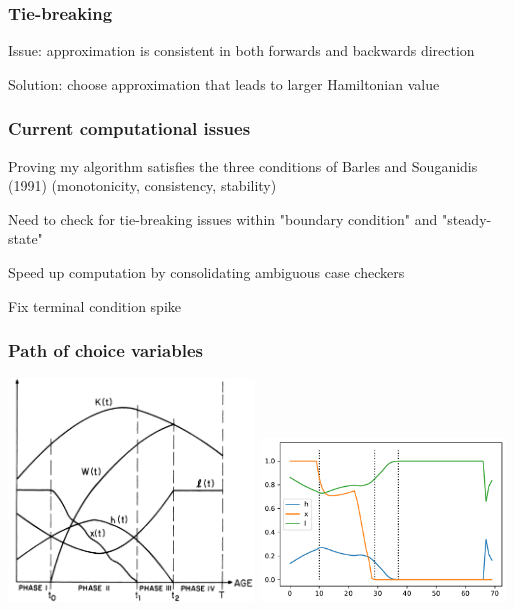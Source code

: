 \documentclass[aspectratio=169]{beamer}
\newenvironment{wideitemize}{\itemize\addtolength{\itemsep}{10pt}}{\enditemize}
\begin{document}
\begin{frame}
    \frametitle{Tie-breaking}

    \begin{wideitemize}
        \item Issue: approximation is consistent in both forwards and backwards direction
        \item Solution: choose approximation that leads to larger Hamiltonian value
    \end{wideitemize}

\end{frame}

\begin{frame}
    \frametitle{Current computational issues}

    \begin{wideitemize}
        \item Proving my algorithm satisfies the three conditions of Barles and Souganidis (1991) (monotonicity, consistency, stability)
        \item Need to check for tie-breaking issues within "boundary condition" and "steady-state"
        \item Speed up computation by consolidating ambiguous case checkers
        \item Fix terminal condition spike
    \end{wideitemize}

\end{frame}

\begin{frame}
    \frametitle{Path of choice variables}
    
        \includegraphics[width=0.49\textwidth]{../output/phases.png}
        \includegraphics[width=0.49\textwidth]{../output/fd_hjb_choice_path.pdf}

\end{frame}
\end{document}
